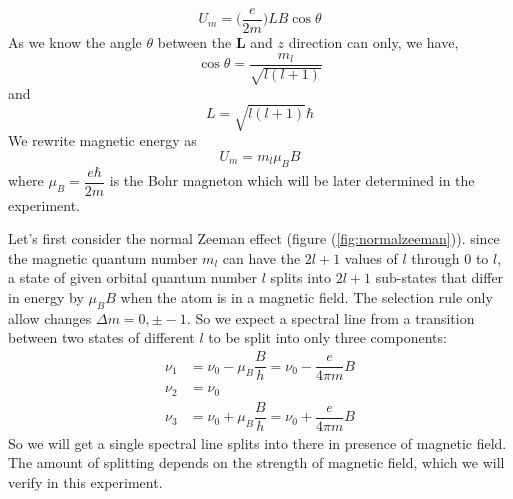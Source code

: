\documentclass[%
 reprint,
nofootinbib,
 amsmath,amssymb,
 aps,
floatfix,
]{revtex4-2}
\begin{document}
    \begin{equation}
        U_m = \Big( \dfrac{e}{2m}\Big) LB \cos \theta
    \end{equation}
    As we know the angle $\theta$ between the $\mathbf{L}$ and $z$ direction can only, we have, 
    \begin{equation}
        \cos \theta = \dfrac{m_l}{\sqrt{l(l+1)}}
    \end{equation}
    and
    \begin{equation}
        L = \sqrt{l(l+1)} \hbar
    \end{equation}
    We rewrite magnetic energy as
    \begin{equation}
        U_m = m_l \mu_B B
    \end{equation}
    where $\mu_B = \dfrac{e \hbar}{2m}$ is the Bohr magneton which will be later determined in the experiment.
    \par
    Let's first consider the normal Zeeman effect (figure (\ref{fig:normalzeeman})). since the magnetic quantum number $m_l$ can have the $2l+1$ values of $l$ through $0$ to $l$, a state of given orbital quantum number $l$ splits into $2l+1$ sub-states that differ in energy by $\mu_B B$ when the atom is in a magnetic field. The selection rule only allow changes $\Delta m = 0, \pm -1$. So we expect a spectral line from a transition between two states of different $l$ to be split into only three components:
    \begin{equation}
        \begin{split}
            \nu_1
            &= \nu_0 - \mu_B \dfrac{B}{h} = \nu_0 - \dfrac{e}{4 \pi m} B \\
            \nu_2
            &= \nu_0 \\
            \nu_3
            &= \nu_0 + \mu_B \dfrac{B}{h} = \nu_0 + \dfrac{e}{4 \pi m} B
        \end{split}
    \end{equation}
    So we will get a single spectral line splits into there in presence of magnetic field. The amount of splitting depends on the strength of magnetic field, which we will verify in this experiment.
\end{document}
